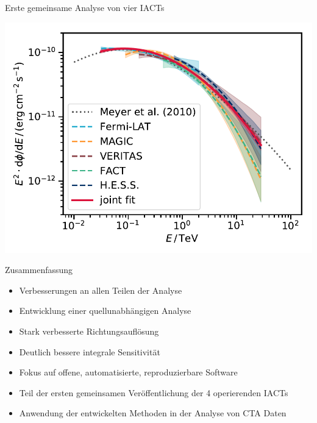 \documentclass[aspectratio=1610, 9pt]{beamer}
\begin{document}
\begin{frame}[t]{Erste gemeinsame Analyse von vier IACTs}
  \begin{center}%
    \includegraphics[height=0.7\textheight]{images/crab_sed_fit.pdf}%
  \end{center}%
\end{frame}

\begin{frame}[b]{Zusammenfassung}
  \begin{itemize}
    \item Verbesserungen an allen Teilen der Analyse
    \item Entwicklung einer quellunabhängigen Analyse
    \item Stark verbesserte Richtungsauflösung
    \item Deutlich bessere integrale Sensitivität
    \item Fokus auf offene, automatisierte, reproduzierbare Software
    \item Teil der ersten gemeinsamen Veröffentlichung der 4 operierenden IACTs
    \item Anwendung der entwickelten Methoden in der Analyse von CTA Daten
  \end{itemize}

\end{frame}
\end{document}
